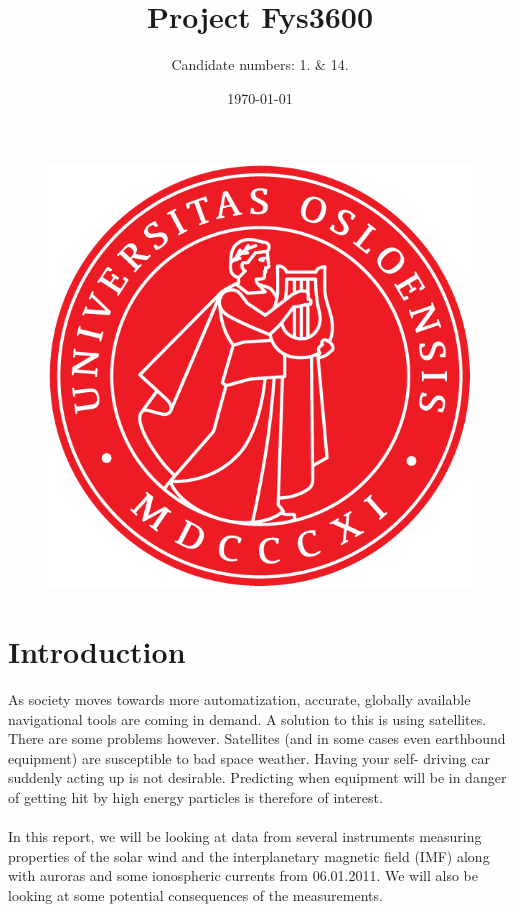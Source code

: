 \documentclass[norsk,a4paper,12pt]{article}
\title{Project Fys3600}
\author{Candidate numbers: 1. \& 14.}
\date{\today}
\begin{document}
\maketitle

\begin{figure}[H]
	\begin{center}
		\includegraphics[scale=1.0]{Figures/uiosegl.png}
	\end{center}
\end{figure}



\newpage

\tableofcontents

\section{Introduction} %
\label{sec:intro}
	As society moves towards more automatization, accurate, globally available navigational tools are coming in demand. A solution to this is using satellites. 			There are some problems however. Satellites (and in some cases even earthbound equipment) are susceptible to bad space weather. Having your self-			driving car suddenly acting up is not desirable. Predicting when equipment will be in danger of getting hit by high energy particles is therefore of interest.\\ 
	\\
	In this report, we will be looking at data from several instruments measuring properties of the solar wind and the interplanetary magnetic field (IMF) along 			with auroras and some ionospheric currents from 06.01.2011. We will also be looking at some potential consequences of the measurements.
\end{document}
